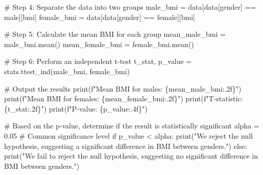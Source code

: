 \documentclass[
  letterpaper,
  DIV=11,
  numbers=noendperiod]{scrartcl}
\newenvironment{Shaded}{\begin{snugshade}}{\end{snugshade}}
\newcommand{\BuiltInTok}[1]{\textcolor[rgb]{0.00,0.23,0.31}{#1}}
\newcommand{\CommentTok}[1]{\textcolor[rgb]{0.37,0.37,0.37}{#1}}
\newcommand{\ControlFlowTok}[1]{\textcolor[rgb]{0.00,0.23,0.31}{#1}}
\newcommand{\FloatTok}[1]{\textcolor[rgb]{0.68,0.00,0.00}{#1}}
\newcommand{\NormalTok}[1]{\textcolor[rgb]{0.00,0.23,0.31}{#1}}
\newcommand{\OperatorTok}[1]{\textcolor[rgb]{0.37,0.37,0.37}{#1}}
\newcommand{\SpecialCharTok}[1]{\textcolor[rgb]{0.37,0.37,0.37}{#1}}
\newcommand{\SpecialStringTok}[1]{\textcolor[rgb]{0.13,0.47,0.30}{#1}}
\newcommand{\StringTok}[1]{\textcolor[rgb]{0.13,0.47,0.30}{#1}}
\begin{document}
\begin{Shaded}
\begin{Highlighting}[]
\CommentTok{\# Step 4: Separate the data into two groups}
\NormalTok{male\_bmi }\OperatorTok{=}\NormalTok{ data[data[}\StringTok{\textquotesingle{}gender\textquotesingle{}}\NormalTok{] }\OperatorTok{==} \StringTok{\textquotesingle{}male\textquotesingle{}}\NormalTok{][}\StringTok{\textquotesingle{}bmi\textquotesingle{}}\NormalTok{]}
\NormalTok{female\_bmi }\OperatorTok{=}\NormalTok{ data[data[}\StringTok{\textquotesingle{}gender\textquotesingle{}}\NormalTok{] }\OperatorTok{==} \StringTok{\textquotesingle{}female\textquotesingle{}}\NormalTok{][}\StringTok{\textquotesingle{}bmi\textquotesingle{}}\NormalTok{]}

\CommentTok{\# Step 5: Calculate the mean BMI for each group}
\NormalTok{mean\_male\_bmi }\OperatorTok{=}\NormalTok{ male\_bmi.mean()}
\NormalTok{mean\_female\_bmi }\OperatorTok{=}\NormalTok{ female\_bmi.mean()}

\CommentTok{\# Step 6: Perform an independent t{-}test}
\NormalTok{t\_stat, p\_value }\OperatorTok{=}\NormalTok{ stats.ttest\_ind(male\_bmi, female\_bmi)}

\CommentTok{\# Output the results}
\BuiltInTok{print}\NormalTok{(}\SpecialStringTok{f"Mean BMI for males: }\SpecialCharTok{\{}\NormalTok{mean\_male\_bmi}\SpecialCharTok{:.2f\}}\SpecialStringTok{"}\NormalTok{)}
\BuiltInTok{print}\NormalTok{(}\SpecialStringTok{f"Mean BMI for females: }\SpecialCharTok{\{}\NormalTok{mean\_female\_bmi}\SpecialCharTok{:.2f\}}\SpecialStringTok{"}\NormalTok{)}
\BuiltInTok{print}\NormalTok{(}\SpecialStringTok{f"T{-}statistic: }\SpecialCharTok{\{}\NormalTok{t\_stat}\SpecialCharTok{:.2f\}}\SpecialStringTok{"}\NormalTok{)}
\BuiltInTok{print}\NormalTok{(}\SpecialStringTok{f"P{-}value: }\SpecialCharTok{\{}\NormalTok{p\_value}\SpecialCharTok{:.4f\}}\SpecialStringTok{"}\NormalTok{)}

\CommentTok{\# Based on the p{-}value, determine if the result is statistically significant}
\NormalTok{alpha }\OperatorTok{=} \FloatTok{0.05}  \CommentTok{\# Common significance level}
\ControlFlowTok{if}\NormalTok{ p\_value }\OperatorTok{\textless{}}\NormalTok{ alpha:}
    \BuiltInTok{print}\NormalTok{(}\StringTok{"We reject the null hypothesis, suggesting a significant difference in BMI between genders."}\NormalTok{)}
\ControlFlowTok{else}\NormalTok{:}
    \BuiltInTok{print}\NormalTok{(}\StringTok{"We fail to reject the null hypothesis, suggesting no significant difference in BMI between genders."}\NormalTok{)}
\end{Highlighting}
\end{Shaded}
\end{document}
